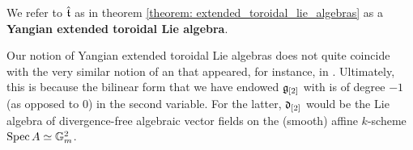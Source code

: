         \begin{definition} \label{def: extended_toroidal_lie_algebras}
            We refer to $\hat{\mathfrak{t}}$ as in theorem \ref{theorem: extended_toroidal_lie_algebras} as a \textbf{Yangian extended toroidal Lie algebra}. 
        \end{definition}
        \begin{remark}
            Our notion of Yangian extended toroidal Lie algebras does not quite coincide with the very similar notion of an  that appeared, for instance, in \cite{billig_representations_of_toroidal_extended_affine_lie_algebras}. Ultimately, this is because the bilinear form that we have endowed $\mathfrak{g}_{[2]}$ with is of degree $-1$ (as opposed to $0$) in the second variable. For the latter, $\mathfrak{d}_{[2]}$ would be the Lie algebra of divergence-free algebraic vector fields on the (smooth) affine $k$-scheme $\operatorname{Spec} A \simeq \mathbb{G}_m^2$.
        \end{remark}
        
